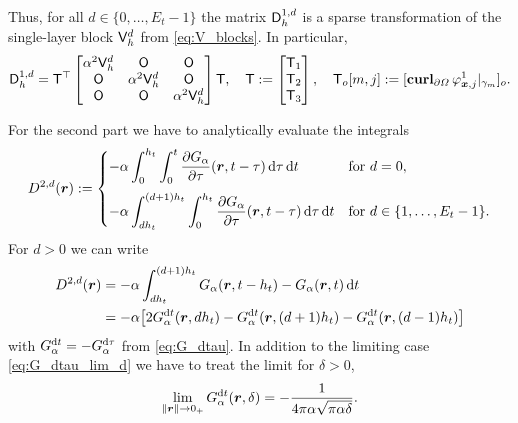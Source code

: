 \documentclass[a4paper,11pt]{article}
\begin{document}
Thus, for all $d \in \{0,\ldots,E_t-1\}$ the matrix ${{\mathsf{D}}}_h^{1,d}$ is a sparse transformation of the single-layer block ${{\mathsf{V}}}^d_h$ from \eqref{eq:V_blocks}. In particular,
\begin{equation*}
  {\ensuremath{{\mathsf{D}}}}_h^{1,d} = {{\mathsf{T}}}^\top 
  \begin{bmatrix}
    \alpha^2{{\mathsf{V}}}^d_h & {{\mathsf{O}}} & {{\mathsf{O}}} \\
    {{\mathsf{O}}} & \alpha^2{{\mathsf{V}}}^d_h & {{\mathsf{O}}} \\
    {{\mathsf{O}}} & {{\mathsf{O}}} & \alpha^2{{\mathsf{V}}}^d_h
  \end{bmatrix}
  {\ensuremath{{\mathsf{T}}}},\quad
  {\ensuremath{{\mathsf{T}}}} :=
  \begin{bmatrix}
    {\ensuremath{{\mathsf{T}}}}_1 \\
    {{\mathsf{T}}}_2 \\
    {{\mathsf{T}}}_3
  \end{bmatrix},\quad
  {\ensuremath{{\mathsf{T}}}}_o[m,j] := [\operatorname{\mathbf{curl}}_{\partial\Omega} \varphi^1_{{{\bm{x}}},j}|_{\gamma_m}]_o.
\end{equation*}

For the second part we have to analytically evaluate the integrals
\begin{equation*}
  D^{2,d}({{\bm{r}}}) := 
  \begin{cases}
  \displaystyle
    -\alpha \int_{0}^{h_t} \int_{0}^{t} \frac{\partial G_\alpha}{\partial \tau}({{\bm{r}}},t-\tau) \,{\mathrm{d}}\tau \,{\mathrm{d}} t & \text{for } d = 0, \\[4mm]
  \displaystyle
    -\alpha \int_{dh_t}^{(d+1)h_t} \int_{0}^{h_t} \frac{\partial G_\alpha}{\partial \tau}({{\bm{r}}},t-\tau) \,{\mathrm{d}}\tau \,{\mathrm{d}} t & \text{for } d \in \{1,\ldots,E_t-1\}.
  \end{cases}
\end{equation*}
For $d>0$ we can write
\begin{align*}
  D^{2,d}({{\bm{r}}}) &= -\alpha \int_{dh_t}^{(d+1)h_t} G_\alpha({{\bm{r}}},t-h_t) - G_\alpha({{\bm{r}}},t) \,{\mathrm{d}} t \\
  &= -\alpha \big[ 2 G_\alpha^{{\mathrm{d}} t}( {{\bm{r}}}, dh_t ) - G_\alpha^{{\mathrm{d}} t}({{\bm{r}}}, (d + 1)h_t) - G_\alpha^{{\mathrm{d}} t}({{\bm{r}}}, (d - 1)h_t ) \big]
\end{align*}
with $G_\alpha^{{\mathrm{d}} t} = -G_\alpha^{{\mathrm{d}} \tau}$ from \eqref{eq:G_dtau}. In addition to the limiting case \eqref{eq:G_dtau_lim_d} we have to treat the limit for $\delta>0$,
\begin{equation*}
  \lim_{\|{{\bm{r}}}\| \to 0_+} G^{{\mathrm{d}} t}_\alpha({{\bm{r}}},\delta) = -\frac{1}{4\pi\alpha\sqrt{\pi\alpha\delta}}.
\end{equation*}
\end{document}
